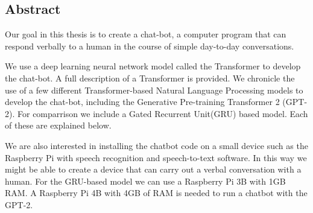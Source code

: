 
\begin{center}
	
\section*{Abstract}
\end{center}



Our goal in this thesis is to create a chat-bot, a computer program that can respond verbally to a human in the course of simple day-to-day conversations.

We use a deep learning neural network model called the Transformer to develop the chat-bot. A full description of a Transformer is provided. We chronicle  the use of a few different Transformer-based Natural Language Processing models to develop the chat-bot, including the Generative Pre-training Transformer 2 (GPT-2). For comparrison we include a Gated Recurrent Unit(GRU) based model. Each of these are explained below.

We are also interested in installing the chatbot code on a small device  such as the Raspberry Pi with speech recognition and speech-to-text software. In this way we might be able to create a device that can carry out a verbal conversation with a human. For the GRU-based model we can use a Raspberry Pi 3B with 1GB RAM. A Raspberry Pi 4B with 4GB of RAM is needed to run a chatbot with the GPT-2. 


